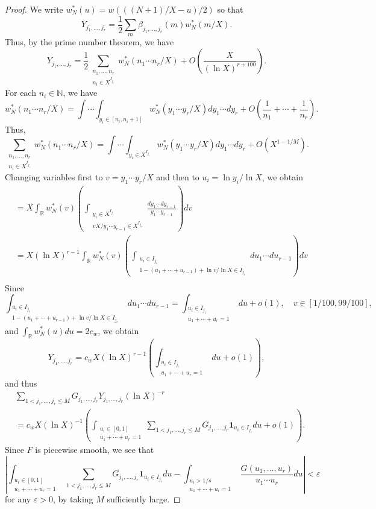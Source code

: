\documentclass{amsart}
\theoremstyle{definition}
\theoremstyle{remark}
\newcommand{\1}{
    \bm{1}
}
\begin{document}
\begin{proof}
We write $w^*_N(u)=w(((N+1)/X - u)/2)$ so that
\[ Y_{j_1,\ldots,j_r} = \frac{1}{2} \sum_{m} \beta_{j_1,\ldots,j_r}(m) w^*_N(m/X). \]
Thus, by the prime number theorem, we have
\[ Y_{j_1,\ldots,j_r} = \frac{1}{2} \sum_{\substack{n_1, \ldots, n_r \\ n_i \in X^{I_{j_i}}}} w^*_N(n_1 \cdots n_r/X) + O\left( \frac{X}{(\ln{X})^{r+100}} \right). \]
For each $n_i \in \mathbb{N}$, we have
\[ w^*_N(n_1 \cdots n_r/X) = \int \cdots \int_{y_i \in [n_i,n_i+1]} w^*_N(y_1 \cdots y_r/X) dy_1 \cdots dy_r + O\left( \frac{1}{n_1} + \cdots + \frac{1}{n_r} \right). \]
Thus,
\[ \sum_{\substack{n_1, \ldots, n_r \\ n_i \in X^{I_{j_i}}}} w^*_N(n_1 \cdots n_r/X) = \int \cdots \int_{y_i \in X^{I_{j_i}}} w^*_N(y_1 \cdots y_r/X) dy_1 \cdots dy_r + O(X^{1-1/M}). \]
Changing variables first to $v=y_1 \cdots y_r/X$ and then to $u_i=\ln{y_i}/\ln{X}$, we obtain
\begin{align*}
&= X \int_{\mathbb{R}} w^*_N(v) \left( \int_{\substack{y_i \in X^{I_{j_i}} \\ vX/y_1 \cdots y_{r-1} \in X^{I_{j_r}}}} \frac{dy_1 \cdots dy_{r-1}}{y_1 \cdots y_{r-1}} \right) dv \\
&= X (\ln{X})^{r-1} \int_{\mathbb{R}} w^*_N(v) \left( \int_{\substack{u_i \in I_{j_i} \\ 1-(u_1+\cdots+u_{r-1}) + \ln{v}/\ln{X} \in I_{j_r}}} du_1 \cdots du_{r-1} \right) dv \\
\end{align*}
Since
\[ \int_{\substack{u_i \in I_{j_i} \\ 1-(u_1+\cdots+u_{r-1}) + \ln{v}/\ln{X} \in I_{j_r}}} du_1 \cdots du_{r-1} = \int_{\substack{u_i \in I_{j_i} \\ u_1+\cdots+u_r=1}} du + o(1), \quad v \in [1/100,99/100], \]
and $\int_{\mathbb{R}} w^*_N(u) du = 2c_w$, we obtain
\[ Y_{j_1,\ldots,j_r} = c_w X (\ln{X})^{r-1} \left( \int_{\substack{u_i \in I_{j_i} \\ u_1+\cdots+u_r=1}} du + o(1) \right), \]
and thus
\begin{align*}
&\sum_{1<j_1,\ldots,j_r \leq M} G_{j_1,\ldots,j_r} Y_{j_1,\ldots,j_r} (\ln{X})^{-r} \\
&= c_w X (\ln{X})^{-1} \left( \int_{\substack{u_i \in [0,1] \\ u_1+\cdots+u_r=1}} \sum_{1<j_1,\ldots,j_r \leq M} G_{j_1,\ldots,j_r} \1_{u_i \in I_{j_i}} du + o(1) \right). 
\end{align*}
Since $F$ is piecewise smooth, we see that
\[ \left| \int_{\substack{u_i \in [0,1] \\ u_1+\cdots+u_r=1}} \sum_{1<j_1,\ldots,j_r \leq M} G_{j_1,\ldots,j_r} \1_{u_i \in I_{j_i}} du - \int_{\substack{u_i>1/s \\ u_1+\cdots+u_r=1}} \frac{G(u_1,\ldots,u_r)}{u_1 \cdots u_r} du \right| < \varepsilon \]
for any $\varepsilon>0$, by taking $M$ sufficiently large. 


\end{proof}
\end{document}
